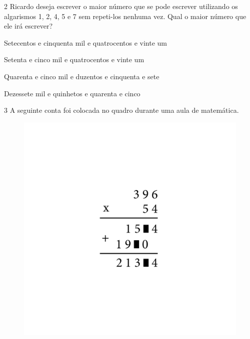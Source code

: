 \num{2} Ricardo deseja escrever o maior número que se pode escrever
utilizando os algarismos 1, 2, 4, 5 e 7 sem repeti-los nenhuma vez. Qual
o maior número que ele irá escrever?

\begin{escolha}
\item
  Setecentos e cinquenta mil e quatrocentos e vinte um
\item
  Setenta e cinco mil e quatrocentos e vinte um
\item
  Quarenta e cinco mil e duzentos e cinquenta e sete
\item
  Dezessete mil e quinhetos e quarenta e cinco
\end{escolha}


\num{3} A seguinte conta foi colocada no quadro durante uma aula de
matemática.

\begin{figure}[htpb!]
\includegraphics[width=\textwidth]{../ilustracoes/MAT5/SAEB_5ANO_MAT_figura121.png}
\end{figure}

